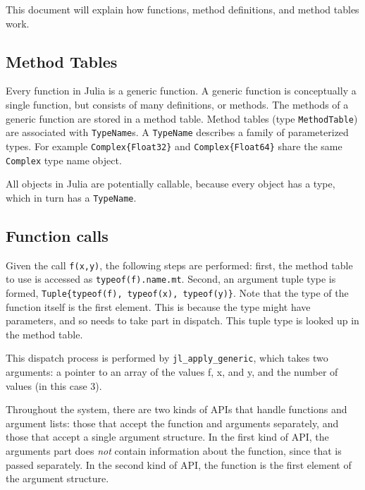 This document will explain how functions, method definitions, and method tables work.



\hypertarget{791619394702824269}{}


\subsection{Method Tables}



Every function in Julia is a generic function. A generic function is conceptually a single function, but consists of many definitions, or methods. The methods of a generic function are stored in a method table. Method tables (type \texttt{MethodTable}) are associated with \texttt{TypeName}s. A \texttt{TypeName} describes a family of parameterized types. For example \texttt{Complex\{Float32\}} and \texttt{Complex\{Float64\}} share the same \texttt{Complex} type name object.



All objects in Julia are potentially callable, because every object has a type, which in turn has a \texttt{TypeName}.



\hypertarget{5677321158644388515}{}


\subsection{Function calls}



Given the call \texttt{f(x,y)}, the following steps are performed: first, the method table to use is accessed as \texttt{typeof(f).name.mt}. Second, an argument tuple type is formed, \texttt{Tuple\{typeof(f), typeof(x), typeof(y)\}}. Note that the type of the function itself is the first element. This is because the type might have parameters, and so needs to take part in dispatch. This tuple type is looked up in the method table.



This dispatch process is performed by \texttt{jl\_apply\_generic}, which takes two arguments: a pointer to an array of the values f, x, and y, and the number of values (in this case 3).



Throughout the system, there are two kinds of APIs that handle functions and argument lists: those that accept the function and arguments separately, and those that accept a single argument structure. In the first kind of API, the {\textquotedbl}arguments{\textquotedbl} part does \emph{not} contain information about the function, since that is passed separately. In the second kind of API, the function is the first element of the argument structure.



